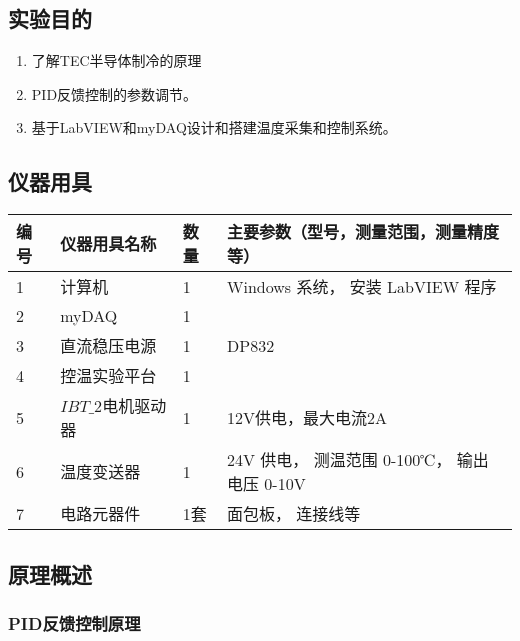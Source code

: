 \documentclass[dvipsnames, svgnames,a4paper,11pt]{article}
\begin{document}
\subsection{实验目的}
\begin{enumerate}
	\item 了解TEC半导体制冷的原理
	\item PID反馈控制的参数调节。
	\item 基于LabVIEW和myDAQ设计和搭建温度采集和控制系统。
	
	
\end{enumerate}

\subsection{仪器用具}
\begin{table}[htbp]
	\centering
	\renewcommand\arraystretch{1.6}
	\begin{tabular}{p{}|p{}|p{}|p{}}
		\hline
		编号& 仪器用具名称 			& 数量 		&  主要参数（型号，测量范围，测量精度等） \\
		\hline
		1	&	计算机 				&1 			& Windows 系统， 安装 LabVIEW 程序\\

		2	&	myDAQ 				&1 			& 		 \\
		
		3	&	直流稳压电源 		& 1 		&	DP832 \\
		
		4	&	控温实验平台		&1 			&   \\
		
		5	&	$IBT\_2$电机驱动器	&	1 		& 12V供电，最大电流2A \\

		6	&	温度变送器			&	1 		&		24V 供电， 测温范围 0-100℃， 输出电压 0-10V \\

		7	&	电路元器件			&	1套 	& 面包板， 连接线等 \\
		\hline
	\end{tabular}
\end{table}

\subsection{原理概述}

    \subsubsection{PID反馈控制原理}
\end{document}

